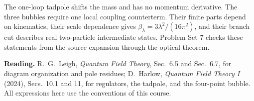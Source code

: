 \documentclass[11pt]{article}
\begin{document}
\begin{keyidea}
The one-loop tadpole shifts the mass and has no momentum derivative.
The three bubbles require one local coupling counterterm. Their finite
parts depend on kinematics, their scale dependence gives
\(\beta_\lambda=3\lambda^2/(16\pi^2)\), and their branch cut describes
real two-particle intermediate states. Problem Set 7 checks these
statements from the source expansion through the optical theorem.
\end{keyidea}
{\footnotesize\textbf{Reading.} R.~G.~Leigh, \emph{Quantum Field Theory},
Sec.~6.5 and Sec.~6.7, for diagram organization and pole residues;
D.~Harlow, \emph{Quantum Field Theory I} (2024), Secs.~10.1 and 11,
for regulators, the tadpole, and the four-point bubble. All expressions
here use the conventions of this course.}
\end{document}
